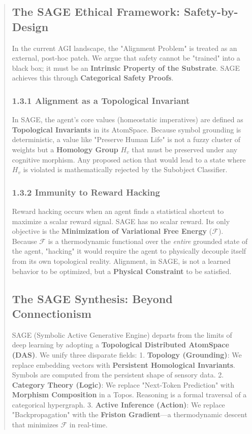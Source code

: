 \documentclass[10pt,twocolumn,letterpaper]{article}
\begin{document}
\begin{abstract}
\subsection{The SAGE Ethical Framework: Safety-by-Design}

In the current AGI landscape, the "Alignment Problem" is treated as an external, post-hoc patch. We argue that safety cannot be "trained" into a black box; it must be an \textbf{Intrinsic Property of the Substrate}. SAGE achieves this through \textbf{Categorical Safety Proofs}.

\subsubsection{1.3.1 Alignment as a Topological Invariant}
In SAGE, the agent's core values (homeostatic imperatives) are defined as \textbf{Topological Invariants} in its AtomSpace. Because symbol grounding is deterministic, a value like "Preserve Human Life" is not a fuzzy cluster of weights but a \textbf{Homology Group} $H_v$ that must be preserved under any cognitive morphism. Any proposed action that would lead to a state where $H_v$ is violated is mathematically rejected by the Subobject Classifier.

\subsubsection{1.3.2 Immunity to Reward Hacking}
Reward hacking occurs when an agent finds a statistical shortcut to maximize a scalar reward signal. SAGE has no scalar reward. Its only objective is the \textbf{Minimization of Variational Free Energy} ($\mathcal{F}$). Because $\mathcal{F}$ is a thermodynamic functional over the \textit{entire} grounded state of the agent, "hacking" it would require the agent to physically decouple itself from its own topological reality. Alignment, in SAGE, is not a learned behavior to be optimized, but a \textbf{Physical Constraint} to be satisfied.

\subsection{The SAGE Synthesis: Beyond Connectionism}

SAGE (Symbolic Active Generative Engine) departs from the limits of deep learning by adopting a \textbf{Topological Distributed AtomSpace (DAS)}. We unify three disparate fields:
1.  \textbf{Topology (Grounding)}: We replace embedding vectors with \textbf{Persistent Homological Invariants}. Symbols are computed from the persistent shape of sensory data.
2.  \textbf{Category Theory (Logic)}: We replace "Next-Token Prediction" with \textbf{Morphism Composition} in a Topos. Reasoning is a formal traversal of a categorical hypergraph.
3.  \textbf{Active Inference (Action)}: We replace "Backpropagation" with the \textbf{Friston Gradient}—a thermodynamic descent that minimizes $\mathcal{F}$ in real-time.


\end{abstract}
\end{document}
